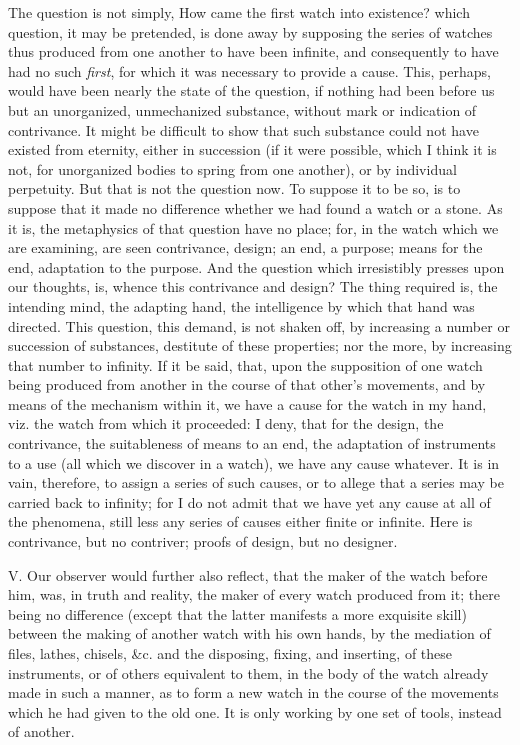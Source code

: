 The question is not simply, How came the first watch into existence?
which question, it may be pretended, is done away by supposing the
series of watches thus produced from one another to have been
infinite, and consequently to have had no such \textit{first}, for
which it was necessary to provide a cause. This, perhaps, would have
been nearly the state of the question, if nothing had been before us
but an unorganized, unmechanized substance, without mark or indication
of contrivance. It might be difficult to show that such substance
could  not have existed from eternity, either in succession
(if it were possible, which I think it is not, for unorganized bodies
to spring from one another), or by individual perpetuity. But that is
not the question now. To suppose it to be so, is to suppose that it
made no difference whether we had found a watch or a stone. As it is,
the metaphysics of that question have no place; for, in the watch
which we are examining, are seen contrivance, design; an end, a
purpose; means for the end, adaptation to the purpose. And the
question which irresistibly presses upon our thoughts, is, whence this
contrivance and design? The thing required is, the intending mind, the
adapting hand, the intelligence by which that hand was directed. This
question, this demand, is not shaken off, by increasing a number or
succession of substances, destitute of these properties; nor the more,
by increasing that number to infinity. If it be said, that, upon the
supposition of one watch being produced from another in the course of
that other's movements, and by means of the mechanism within it, we
have a cause for the watch in my hand, viz. the watch from which it
proceeded: I deny, that for the design, the contrivance, the
suitableness of means to an end, the adaptation of instruments to a
use (all which  we discover in a watch), we have any cause
whatever. It is in vain, therefore, to assign a series of such causes,
or to allege that a series may be carried back to infinity; for I do
not admit that we have yet any cause at all of the phenomena, still
less any series of causes either finite or infinite. Here is
contrivance, but no contriver; proofs of design, but no designer.

V. Our observer would further also reflect, that the maker of the
watch before him, was, in truth and reality, the maker of every watch
produced from it; there being no difference (except that the latter
manifests a more exquisite skill) between the making of another watch
with his own hands, by the mediation of files, lathes, chisels, \&c.
and the disposing, fixing, and inserting, of these instruments, or of
others equivalent to them, in the body of the watch already made in
such a manner, as to form a new watch in the course of the movements
which he had given to the old one. It is only working by one set of
tools, instead of another.

